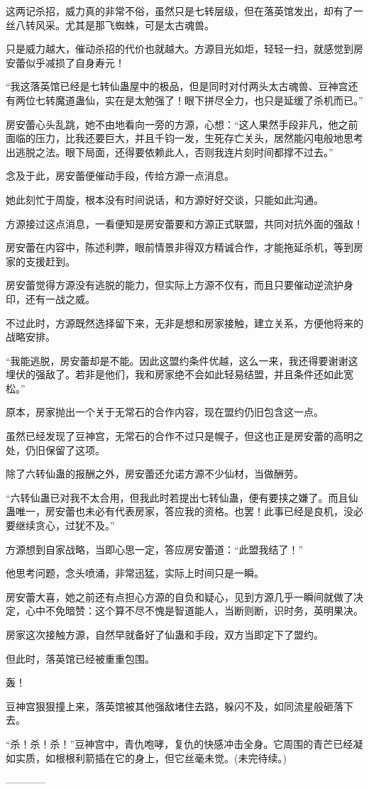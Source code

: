 \begin{this_body}
这两记杀招，威力真的非常不俗，虽然只是七转层级，但在落英馆发出，却有了一丝八转风采。尤其是那飞蜘蛛，可是太古魂兽。

只是威力越大，催动杀招的代价也就越大。方源目光如炬，轻轻一扫，就感觉到房安蕾似乎减损了自身寿元！

“我这落英馆已经是七转仙蛊屋中的极品，但是同时对付两头太古魂兽、豆神宫还有两位七转魔道蛊仙，实在是太勉强了！眼下拼尽全力，也只是延缓了杀机而已。”

房安蕾心头乱跳，她不由地看向一旁的方源，心想：“这人果然手段非凡，他之前面临的压力，比我还要巨大，并且千钧一发，生死存亡关头，居然能闪电般地思考出逃脱之法。眼下局面，还得要依赖此人，否则我连片刻时间都撑不过去。”

念及于此，房安蕾便催动手段，传给方源一点消息。

她此刻忙于周旋，根本没有时间说话，和方源好好交谈，只能如此沟通。

方源接过这点消息，一看便知是房安蕾要和方源正式联盟，共同对抗外面的强敌！

房安蕾在内容中，陈述利弊，眼前情景非得双方精诚合作，才能拖延杀机，等到房家的支援赶到。

房安蕾觉得方源没有逃脱的能力，但实际上方源不仅有，而且只要催动逆流护身印，还有一战之威。

不过此时，方源既然选择留下来，无非是想和房家接触，建立关系，方便他将来的战略安排。

“我能逃脱，房安蕾却是不能。因此这盟约条件优越，这么一来，我还得要谢谢这埋伏的强敌了。若非是他们，我和房家绝不会如此轻易结盟，并且条件还如此宽松。”

原本，房家抛出一个关于无常石的合作内容，现在盟约仍旧包含这一点。

虽然已经发现了豆神宫，无常石的合作不过只是幌子，但这也正是房安蕾的高明之处，仍旧保留了这项。

除了六转仙蛊的报酬之外，房安蕾还允诺方源不少仙材，当做酬劳。

“六转仙蛊已对我不太合用，但我此时若提出七转仙蛊，便有要挟之嫌了。而且仙蛊唯一，房安蕾也未必有代表房家，答应我的资格。也罢！此事已经是良机，没必要继续贪心，过犹不及。”

方源想到自家战略，当即心思一定，答应房安蕾道：“此盟我结了！”

他思考问题，念头喷涌，非常迅猛，实际上时间只是一瞬。

房安蕾大喜，她之前还有点担心方源的自负和疑心，见到方源几乎一瞬间就做了决定，心中不免暗赞：这个算不尽不愧是智道能人，当断则断，识时务，英明果决。

房家这次接触方源，自然早就备好了仙蛊和手段，双方当即定下了盟约。

但此时，落英馆已经被重重包围。

轰！

豆神宫狠狠撞上来，落英馆被其他强敌堵住去路，躲闪不及，如同流星般砸落下去。

“杀！杀！杀！”豆神宫中，青仇咆哮，复仇的快感冲击全身。它周围的青芒已经凝如实质，如根根利箭插在它的身上，但它丝毫未觉。(未完待续。)

------------

\end{this_body}


